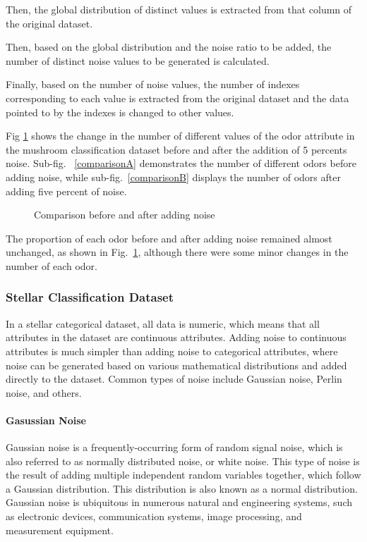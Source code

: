 \documentclass[runningheads,a4paper]{llncs}
\begin{document}
Then, the global distribution of distinct values is extracted from that column of the original dataset.

Then, based on the global distribution and the noise ratio to be added, the number of distinct noise values to be generated is calculated.

Finally, based on the number of noise values, the number of indexes corresponding to each value is extracted from the original dataset and the data pointed to by the indexes is changed to other values.

Fig \ref{Comparison before and after adding noise} shows the change in the number of different values of the odor attribute in the mushroom classification dataset before and after the addition of 5 percents noise.
Sub-fig. ~\ref{comparisonA} demonstrates the number of different odors before adding noise, while sub-fig.~\ref{comparisonB} displays the number of odors after adding five percent of noise.
\begin{figure}[H]
    \centering

    \hfill


    \caption{Comparison before and after adding noise}
    \label{Comparison before and after adding noise}
\end{figure}

The proportion of each odor before and after adding noise remained almost unchanged, as shown in Fig.~\ref{Comparison before and after adding noise}, although there were some minor changes in the number of each odor.

\subsubsection{Stellar Classification Dataset}
In a stellar categorical dataset, all data is numeric, which means that all attributes in the dataset are continuous attributes. Adding noise to continuous attributes is much simpler than adding noise to categorical attributes, where noise can be generated based on various mathematical distributions and added directly to the dataset.
Common types of noise include Gaussian noise, Perlin noise, and others.
\paragraph{Gasussian Noise}
Gaussian noise is a frequently-occurring form of random signal noise, which is also referred to as normally distributed noise, or white noise\cite{jain1989fundamentals}. This type of noise is the result of adding multiple independent random variables together, which follow a Gaussian distribution. This distribution is also known as a normal distribution. Gaussian noise is ubiquitous in numerous natural and engineering systems, such as electronic devices, communication systems, image processing, and measurement equipment.
\end{document}
